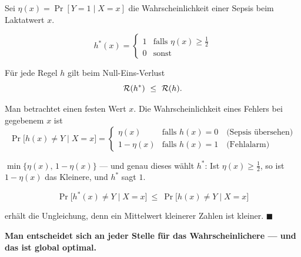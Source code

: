 \begin{merksatz}
Sei $\eta(x) = \Pr[Y=1 \mid X=x]$ die Wahrscheinlichkeit einer Sepsis beim Laktatwert $x$.

\begin{definition}
\[ h^{*}(x) = \begin{cases} 1 & \text{falls } \eta(x) \ge \tfrac12\\ 0 & \text{sonst} \end{cases} \]
\end{definition}

Für jede Regel $h$ gilt beim Null-Eins-Verlust
\[ \Risk(h^{*}) \ \le\ \Risk(h) . \]

Man betrachtet einen festen Wert $x$. Die Wahrscheinlichkeit eines Fehlers bei gegebenem $x$ ist
\[ \Pr\bigl[h(x) \ne Y \mid X=x\bigr] = \begin{cases} \eta(x) & \text{falls } h(x)=0 \quad\text{(Sepsis übersehen)}\\ 1-\eta(x) & \text{falls } h(x)=1 \quad\text{(Fehlalarm)} \end{cases} \]

 $\min\{\eta(x),\,1-\eta(x)\}$ --- und genau dieses wählt $h^{*}$: Ist $\eta(x) \ge \tfrac12$, so ist $1-\eta(x)$ das Kleinere, und $h^{*}$ sagt $1$.

\[ \Pr\bigl[h^{*}(x) \ne Y \mid X=x\bigr] \ \le\ \Pr\bigl[h(x) \ne Y \mid X=x\bigr] \]

 erhält die Ungleichung, denn ein Mittelwert kleinerer Zahlen ist kleiner. $\blacksquare$

\begin{center}
\begin{minipage}{0.9\textwidth}
\textbf{Man entscheidet sich an jeder Stelle für das Wahrscheinlichere --- und das ist global optimal.}
\end{minipage}
\end{center}
\end{merksatz}

